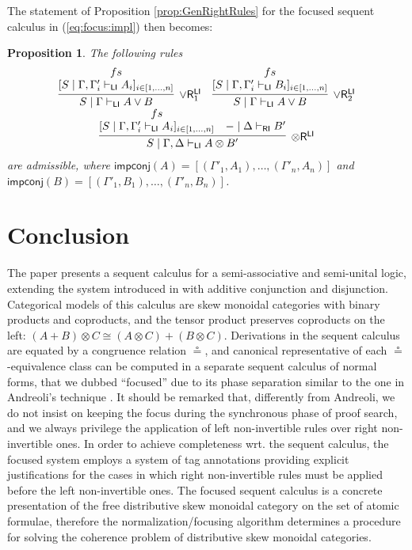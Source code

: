 \documentclass[submission,copyright,creativecommons]{eptcs}
\newtheorem{proposition}[theorem]{Proposition}
\theoremstyle{definition}
\newcommand{\tr}{\otimes \mathsf{R}}
\newcommand{\orrone}{\lor \mathsf{R}_{1}}
\newcommand{\orrtwo}{\lor \mathsf{R}_{2}}
\newcommand{\ot}{\otimes}
\newcommand{\RI}{\mathsf{RI}}
\newcommand{\LI}{\mathsf{LI}}
\newcommand{\impconj}[1]{\mathsf{impconj} (#1)}
\newcommand\niccolo[1]{\mbox{}
{\marginpar{\color{red}NV}}
{\sf\noindent\color{red}#1}}%
\begin{document}
The statement of Proposition \ref{prop:GenRightRules} for the focused sequent calculus in (\ref{eq:focus:impl}) then becomes:
\begin{proposition}\label{prop:GenRightRules:impl}
  The following rules
  \begin{displaymath}
    \begin{array}{c}
      \infer[\orrone^{\LI}]{S \mid \Gamma \vdash_{\LI} A \lor B}{
        \deduce{[S \mid \Gamma , \Gamma'_i \vdash_{\LI} A_i]_{i \in [1 , \dots , n]}}{fs}
      }
      \quad
      \infer[\orrtwo^{\LI}]{S \mid \Gamma \vdash_{\LI} A \lor B}{
        \deduce{[S \mid \Gamma , \Gamma'_i \vdash_{\LI} B_i]_{i \in [1 , \dots , n]}}{fs}
      }
      \\
      \infer[\tr^{\LI}]{S \mid \Gamma , \Delta \vdash_{\LI} A \ot B'}{
        \deduce{[S \mid \Gamma , \Gamma'_i \vdash_{\LI} A_i]_{i \in [1 , \dots , n]}}{fs}
        &
        - \mid \Delta \vdash_{\RI} B'
      }
    \end{array}
  \end{displaymath}
  are admissible, where
  $\impconj{A} = [(\Gamma'_1 , A_1) , \dots , (\Gamma'_n , A_n)]$ and $\impconj{B} = [(\Gamma'_1 , B_1) , \dots , (\Gamma'_n , B_n)]$.
\end{proposition}

\section{Conclusion}
The paper presents a sequent calculus for a semi-associative and semi-unital logic,  extending the system introduced in \cite{uustalu:sequent:2021} with additive conjunction and disjunction. Categorical models of this calculus are skew monoidal categories with binary products and coproducts, and the tensor product preserves coproducts on the left: $(A + B) \ot C \cong (A \ot C) + (B \ot C)$.
Derivations in the sequent calculus are equated by a congruence relation $\circeq$, and canonical representative of each $\circeq$-equivalence class can be computed in a separate sequent calculus of normal forms, that we dubbed ``focused'' due to its phase separation similar to the one in Andreoli's technique \cite{andreoli:logic:1992}.  It should be remarked that, differently from Andreoli, we do not insist on keeping the focus during the synchronous phase of proof search, and we always privilege the application of left non-invertible rules over right non-invertible ones. In order to achieve completeness wrt. the sequent calculus, the focused system employs a system of tag annotations providing explicit justifications for the cases in which right non-invertible rules must be applied before the left non-invertible ones.
The focused sequent calculus is a concrete presentation of the free distributive skew monoidal category on the set of atomic formulae, therefore the normalization/focusing algorithm determines a procedure for solving the coherence problem of distributive skew monoidal categories.
\end{document}

